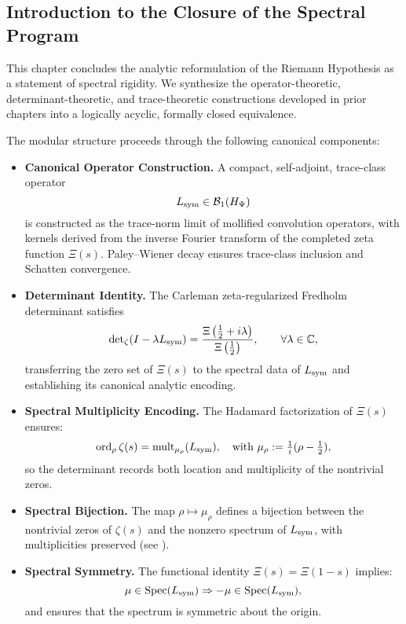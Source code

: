 \subsection*{Introduction to the Closure of the Spectral Program}
\label{subsec:closure_of_spectral_program}

This chapter concludes the analytic reformulation of the Riemann Hypothesis as a statement of spectral rigidity. We synthesize the operator-theoretic, determinant-theoretic, and trace-theoretic constructions developed in prior chapters into a logically acyclic, formally closed equivalence.

\medskip

The modular structure proceeds through the following canonical components:

\begin{itemize}
  \item \textbf{Canonical Operator Construction.}  
  A compact, self-adjoint, trace-class operator
  \[
  L_{\mathrm{sym}} \in \mathcal{B}_1(H_{\Psi})
  \]
  is constructed as the trace-norm limit of mollified convolution operators, with kernels derived from the inverse Fourier transform of the completed zeta function \( \Xi(s) \). Paley–Wiener decay ensures trace-class inclusion and Schatten convergence.

  \item \textbf{Determinant Identity.}  
  The Carleman zeta-regularized Fredholm determinant satisfies
  \[
  \det\nolimits_{\zeta}(I - \lambda L_{\mathrm{sym}}) = \frac{\Xi\left(\tfrac{1}{2} + i\lambda\right)}{\Xi\left(\tfrac{1}{2}\right)},
  \qquad \forall \lambda \in \mathbb{C},
  \]
  transferring the zero set of \( \Xi(s) \) to the spectral data of \( L_{\mathrm{sym}} \) and establishing its canonical analytic encoding.

  \item \textbf{Spectral Multiplicity Encoding.}  
  The Hadamard factorization of \( \Xi(s) \) ensures:
  \[
  \operatorname{ord}_{\rho} \zeta(s) = \operatorname{mult}_{\mu_\rho}(L_{\mathrm{sym}}), \quad \text{with } \mu_\rho := \tfrac{1}{i}(\rho - \tfrac{1}{2}),
  \]
  so the determinant records both location and multiplicity of the nontrivial zeros.

  \item \textbf{Spectral Bijection.}  
  The map \( \rho \mapsto \mu_\rho \) defines a bijection between the nontrivial zeros of \( \zeta(s) \) and the nonzero spectrum of \( L_{\mathrm{sym}} \), with multiplicities preserved (see ).

  \item \textbf{Spectral Symmetry.}  
  The functional identity \( \Xi(s) = \Xi(1 - s) \) implies:
  \[
  \mu \in \operatorname{Spec}(L_{\mathrm{sym}}) \Rightarrow -\mu \in \operatorname{Spec}(L_{\mathrm{sym}}),
  \]
  and ensures that the spectrum is symmetric about the origin.


\end{itemize}

